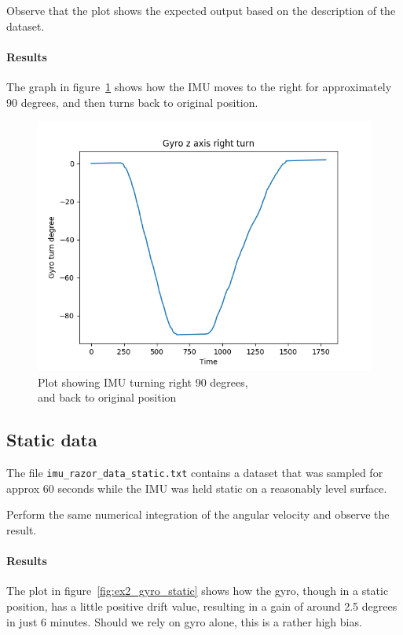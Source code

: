 \documentclass[paper=letter, fontsize=10pt]{article}
\begin{document}
Observe that the plot shows the expected output based on the description of the dataset.

\paragraph{Results} 
The graph in figure~\ref{fig:ex2_gyro_zaxis} shows how the IMU moves to the right for approximately 90 degrees, and then turns back to original position.  
\begin{figure}
	\centering
	\includegraphics[scale=0.65]{Figures/ex2_gyro_zaxis}
	\caption{Plot showing IMU turning right 90 degrees, \\and back to original position}
	\label{fig:ex2_gyro_zaxis}
\end{figure}

\subsection{Static data}
The file \texttt{imu\_razor\_data\_static.txt} contains a dataset that was sampled for approx 60 seconds while the IMU was held static on a reasonably level surface.

Perform the same numerical integration of the angular velocity and observe the result.

\paragraph{Results} The plot in figure~\ref{fig:ex2_gyro_static} shows how the gyro, though in a static position, has a little positive drift value, resulting in a gain of around 2.5 degrees in just 6 minutes. Should we rely on gyro alone, this is a rather high bias.
\end{document}
